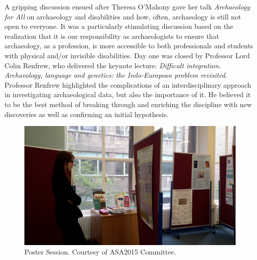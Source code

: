 	A gripping discussion ensued after Theresa O’Mahony gave her talk \textit{Archaeology for All} on archaeology and disabilities and how, often, archaeology is still not open to everyone. It was a particularly stimulating discussion based on the realization that it is our responsibility as archaeologists to ensure that archaeology, as a profession, is more accessible to both professionals and students with physical and/or invisible disabilities. Day one was closed by Professor Lord Colin Renfrew, who delivered the keynote lecture: \textit{Difficult integration. Archaeology, language and genetics: the Indo-European problem revisited}. Professor Renfrew highlighted the complications of an interdisciplinary approach in investigating archaeological data, but also the importance of it. He believed it to be the best method of breaking through and enriching the discipline with new discoveries as well as confirming an initial hypothesis.
\begin{figure}%
	\includegraphics[width=\linewidth]{figures/ASA_Fig1}
	\centering
	\caption{Poster Session. Courtesy of ASA2015 Committee.}
	\label{fig:ASA_Fig1}
\end{figure}
	
